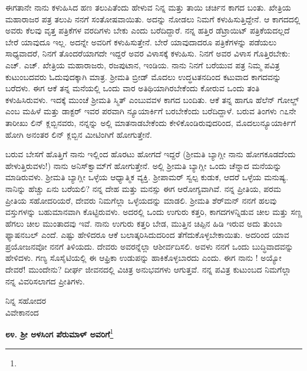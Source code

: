 ಈಗತಾನೇ ನಾನು ಕಳುಹಿಸಿದ ಹಣ ತಲುಪಿತೆಂದು ಹೇಳುವ ನಿನ್ನ ಮತ್ತು ತಾಯಿ ಚರ್ಚಿನ ಕಾಗದ ಬಂತು. ಖೇತ್ರಿಯ ಮಹಾರಾಜರ ಪತ್ರ ತಲುಪಿ ನನಗೆ ಸಂತೋಷವಾಯಿತು. ಅದನ್ನು ನೋಡಲು ನಿಮಗೆ ಕಳುಹಿಸುತ್ತಿದ್ದೇನೆ. ಆ ಕಾಗದದಲ್ಲಿ ಅವರು ಕೆಲವು ವೃತ್ತ ಪತ್ರಿಕೆಗಳ ವರದಿಗಳು ಬೇಕು ಎಂದು ಬರೆದಿದ್ದಾರೆ. ನನ್ನ ಹತ್ತಿರ ಡೆಟ್ರಾಯಿಟ್ ಪತ್ರಿಕೆಯದಲ್ಲದೆ ಬೇರೆ ಯಾವುದೂ ಇಲ್ಲ. ಅದನ್ನೇ ಅವರಿಗೆ ಕಳುಹಿಸುತ್ತೇನೆ. ಬೇರೆ ಯಾವುದಾದರೂ ಪತ್ರಿಕೆಗಳನ್ನು ಪಡೆಯಲು ಸಾಧ್ಯವಾದರೆ, ನಿನಗೆ ತೊಂದರೆಯಾಗದೇ ಇದ್ದರೆ ಅವರ ವಿಳಾಸಕ್ಕೆ ಕಳುಹಿಸು. ನಿನಗೆ ಅವರ ವಿಳಾಸ ಗೊತ್ತಿರಬೇಕು: ಎಚ್. ಎಚ್. ಖೇತ್ರಿಯ ಮಹಾರಾಜರು, ರಜಪುಟಾನ, ಇಂಡಿಯ. ನಾನು ನಿನಗೆ ಬರೆಯುವ ಪತ್ರ ನಿಮ್ಮ ಪವಿತ್ರ ಕುಟುಂಬದವರು ಓದುವುದಕ್ಕಾಗಿ ಮಾತ್ರ. ಶ‍್ರೀಮತಿ ಬ್ರೀಡ್ ಮೊದಲು ಉದ್ಧಟತನದಿಂದ ಕಟುವಾದ ಕಾಗದವನ್ನು ಬರೆದಳು. ಈಗ ಆಕೆ ತನ್ನ ಮನೆಯಲ್ಲಿ ಒಂದು ವಾರ ಅತಿಥಿಯಾಗಿರಬೇಕೆಂದು ಕೋರುವ ಒಂದು ತಂತಿ ಕಳುಹಿಸಿರುವಳು. ಇದಕ್ಕೆ ಮುಂಚೆ ಶ‍್ರೀಮತಿ ಸ್ಮಿತ್ ಎಂಬುವವಳ ಕಾಗದ ಬಂದಿತು. ಆಕೆ ತನ್ನ ಹಾಗೂ ಹೆಲೆನ್ ಗೋಲ್ಡ್ ಎಂಬ ಮಹಿಳೆ ಮತ್ತು ಡಾಕ್ಟರ್ \enginline{-} ಇವರ ಪರವಾಗಿ ನ್ಯೂಯಾರ್ಕಿಗೆ ಬರಬೇಕೆಂದು ಬರೆದಿದ್ದಾಳೆ. ಬರುವ ತಿಂಗಳು ೧೭ನೇ ತಾರೀಖು ಲಿನ್ ಕ್ಲಬ್ಬಿನವರು, ನನ್ನನ್ನು ಅಲ್ಲಿ ಮಾತನಾಡಬೇಕೆಂದು ಕೇಳಿಕೊಂಡಿರುವುದರಿಂದ, ಮೊದಲುನ್ಯೂಯಾರ್ಕಿಗೆ ಹೋಗಿ ಅನಂತರ ಲಿನ್ ಕ್ಲಬ್ಬಿನ ಮೀಟಿಂಗಿಗೆ ಹೋಗುತ್ತೇನೆ.

\vspace{0.1cm}

ಬರುವ ಬೇಸಗೆ ಹೊತ್ತಿಗೆ ನಾನು ಇಲ್ಲಿಂದ ಹೊರಟು ಹೋಗದೆ ಇದ್ದರೆ (ಶ‍್ರೀಮತಿ ಬ್ಯಾಗ್ಲೀ ನಾನು ಹೋಗಕೂಡದೆಂದು ಹೇಳುತ್ತಿರುವಳು!) ನಾನು ಅನಿಸ್‌ಕ್ವಾಮ್‌ಗೆ ಹೋಗುತ್ತೇನೆ. ಅಲ್ಲಿ ಶ‍್ರೀಮತಿ ಬ್ಯಾಗ್ಲೀ ಒಂದು ಚೆನ್ನಾದ ಮನೆಯನ್ನು ಮಾಡಿರುವಳು. ಶ‍್ರೀಮತಿ ಬ್ಯಾಗ್ಲೀ ಒಳ್ಳೆಯ ಆಧ್ಯಾತ್ಮಿಕ ವ್ಯಕ್ತಿ. ಶ‍್ರೀಪಾಮರ್ ಸ್ವಲ್ಪ ಕುಡುಕ, ಆದರೆ ಒಳ್ಳೆಯ ಮನುಷ್ಯ. ನಾನಿನ್ನು ಹೆಚ್ಚು ಏನು ಬರೆಯಲಿ? ನನ್ನ ದೇಹ ಮತ್ತು ಮನಸ್ಸು ಈಗ ಆರೋಗ್ಯವಾಗಿವೆ. ನನ್ನ ಪ್ರೀತಿಯ, ಪರಮ ಪ್ರೀತಿಯ ಸಹೋದರಿಯರೆ, ದೇವರು ನಿಮಗೆಲ್ಲಾ ಒಳ್ಳೆಯದನ್ನು ಮಾಡಲಿ. ಶ‍್ರೀಮತಿ ಶೆರ್‌ಮನ್ ನನಗೆ ಹಲವು ವಸ್ತುಗಳನ್ನು ಬಹುಮಾನವಾಗಿ ಕೊಟ್ಟಿರುವಳು. ಅದರಲ್ಲಿ ಒಂದು ಉಗುರು ಕತ್ತರಿ, ಕಾಗದಗಳನ್ನಿಡುವ ಚೀಲ ಮತ್ತು ಸಣ್ಣ ಹೆಗಲು ಚೀಲ ಮುಂತಾದವು ಇವೆ. ನಾನು ಉಗುರು ಕತ್ತರಿ ಬೇಡ, ಮುತ್ತಿನ ಚಿಪ್ಪಿನ ಹಿಡಿ ಇರುವ ಅದು ತುಂಬಾ ಫ್ಯಾಷನಬಲ್ ಎಂದೆ. ಎಷ್ಟು ಹೇಳಿದರೂ ಆಕೆ ಬಲಾತ್ಕರಿಸಿದುದರಿಂದ ತೆಗೆದುಕೊಳ್ಳಬೇಕಾಯಿತು. ಅದರಿಂದ ಯಾವ ಪ್ರಯೋಜನವೋ ನನಗೆ ತಿಳಿಯದು. ದೇವರು ಅವರನ್ನೆಲ್ಲಾ ಆಶೀರ್ವದಿಸಲಿ. ಅವಳು ನನಗೆ ಒಂದು ಬುದ್ಧಿವಾದವನ್ನು ಹೇಳಿದಳು. ಗಣ್ಯ ಸೊಸೈಟಿಯಲ್ಲಿ ಈ ಆಫ್ರಿಕಾ ಉಡುಪನ್ನು ಹಾಕಿಕೊಳ್ಳಬಾರದು ಎಂದು. ಈಗ ನಾನು ! ಅಯ್ಯೋ ದೇವರೆ! ಮುಂದೇನು? ದೀರ್ಘ ಜೀವನದಲ್ಲಿ ವಿಚಿತ್ರ ಅನುಭವಗಳು ಆಗುತ್ತವೆ. ನನ್ನ ಪವಿತ್ರ ಕುಟುಂಬದ ನಿಮಗೆಲ್ಲಾ ನನ್ನ ವಿವರಿಸಲಾಗದ ಪ್ರೀತಿಗಳು.

{\flushright
ನಿನ್ನ ಸಹೋದರ\\ವಿವೇಕಾನಂದ\par}

\newpage

\begin{center}
\textbf{೮೪. ಶ‍್ರೀ ಅಳಸಿಂಗ ಪೆರುಮಾಳ್ ಅವರಿಗೆ}\footnote{}
\end{center}

